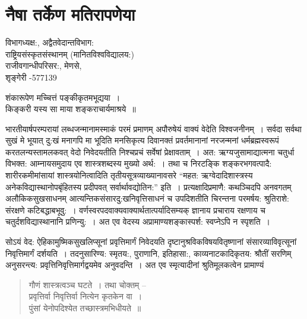 {\fontsize{15}{17}\selectfont
\presetvalues
\chapter{नैषा तर्केण मतिरापणेया}

\begin{center}
\smallskip

विभागध्यक्ष:, अद्वैतवेदान्तविभाग:\\
राष्ट्रियसंस्कृतसंस्थानम् (मानितविश्वविद्यालय:)\\
राजीवगान्धीपरिसर:, मेणसे,\\ 
शृङ्गेरी -577139
\addrule
\end{center}

\begin{center}
शंकारूपेण मच्चित्तं पङ्कीकृतमभूद्यया~। \\
किङ्करी यस्य सा माया शङ्कराचार्यमाश्रये~॥
\end{center}

भारतीयार्षपरम्परायां लब्धजन्मानामस्माकं परमं प्रमाणम् अपौरुषेयं वाक्यं वेदेति विश्वजनीनम्~। सर्वदा सर्वथा सुखं मे भूयात् दु:खं मनागपि मा  भूदिति मनसिकृत्य दिवानक्तं प्रवर्तमानानां नरजन्मनां धर्मब्रह्मस्वरूपं करतलन्यस्तामलकवत् वेदो निवेदयतीति निश्चप्रचं सर्वेषां प्रेक्षावताम्~। अत: ऋग्यजुसामाद्यात्मना चतुर्धा विभक्त: आम्नायसमुदाय एव शास्त्रशब्दस्य मुख्यो अर्थ:~। तथा च निरटङ्कि शङ्करभगवत्पादै: शारीरकमीमांसायां शास्त्रयोनित्वादिति तृतीयसूत्रव्याख्यानावसरे “महत: ऋग्वेदादिशास्त्रस्य अनेकविद्यास्थानोपबृंहितस्य प्रदीपवत् सर्वार्थावद्योतिन:” इति~। प्रत्यक्षादिप्रमाणै: कथञ्चिदपि अनवगतम् अलौकिकसुखसाधनम् आत्यन्तिकसंसारदु:खनिवृत्तिसाधनं च उपदिशतीति चिरन्तना परमर्षय: श्रुतिराशे: संरक्षणे कटिबद्धाबभूवु:~। वर्णस्वरपदवाक्यवाक्यार्थतात्पर्यादिसम्यक् ज्ञानाय प्रचाराय रक्षणाय च चतुर्दशविद्यास्थानानि प्रणिन्यु:~। अत एव वेदस्य अप्रामाण्यशङ्कास्पर्श: स्वप्नेऽपि न स्पृशति~। 

सोऽयं वेद: ऐहिकामुष्मिकसुखलिप्सूनां प्रवृत्तिमार्गं निवेदयति दृष्टानुश्रविकविषयवितृष्णानां संसारव्याविवृत्सूनां निवृत्तिमार्गं दर्शयति~। तदनुसारिण्य: स्मृतय:, पुराणानि, इतिहासा:, काव्यनाटकादिकृतय: श्रौतीं सरणिम् अनुसरन्त्य: प्रवृत्तिनिवृत्तिमार्गद्वयमेव अनुवदन्ति~। अत एव स्मृत्यादीनां श्रुतिमूलकत्वेन प्रामाण्यं
\begin{verse}
गौणं शास्त्रत्वञ्च घटते~। तथा चोक्तम् –\\
प्रवृत्तिर्वा निवृत्तिर्वा नित्येन कृतकेन वा~। \\
पुंसां येनोपदिश्येत तच्छास्त्रमभिधीयते~॥
\end{verse}

}
